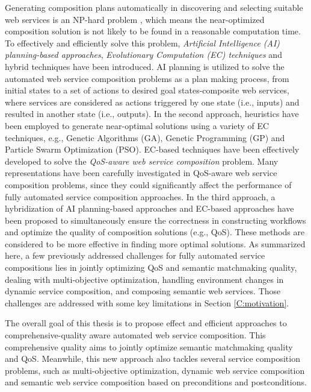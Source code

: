 Generating composition plans automatically in discovering and selecting suitable web services is an NP-hard problem \cite{moghaddam2014service}, which means the near-optimized composition solution is not likely to be found in a reasonable computation time. To effectively and efficiently solve this problem, \emph{Artificial Intelligence (AI) planning-based approaches}, \emph{Evolutionary Computation (EC) techniques} and hybrid techniques have been introduced. AI planning is utilized to solve the automated web service composition problems as a plan making process, from initial states to a set of actions to desired goal states-composite web services, where services are considered as actions triggered by one state (i.e., inputs) and resulted in another state (i.e., outputs). In the second approach, heuristics have been employed to generate near-optimal solutions using a variety of EC techniques, e.g., Genetic Algorithms (GA), Genetic Programming (GP) and Particle Swarm Optimization (PSO). EC-based techniques have been effectively developed to solve the \emph{QoS-aware web service composition} problem. Many representations have been carefully investigated in QoS-aware web service composition problems, since they could significantly affect the performance of fully automated service composition approaches. In the third approach, a hybridization of AI planning-based approaches and EC-based approaches \cite{da2016genetic,ma2015hybrid} have been proposed to simultaneously ensure the correctness in constructing workflows and optimize the quality of composition solutions (e.g., QoS). These methods are considered to be more effective in finding more optimal solutions. As summarized here, a few previously addressed challenges for fully automated service compositions lies in jointly optimizing QoS and semantic matchmaking quality, dealing with multi-objective optimization, handling environment changes in dynamic service composition, and composing semantic web services. Those challenges are addressed with some key limitations in Section \ref{C:motivation}. 

The overall goal of this thesis is to propose effect and efficient approaches to comprehensive-quality aware automated web service composition. This comprehensive quality aims to jointly optimize semantic matchmaking quality and QoS. Meanwhile, this new approach also tackles several service composition problems, such as multi-objective optimization, dynamic web service composition and semantic web service composition based on preconditions and postconditions.


